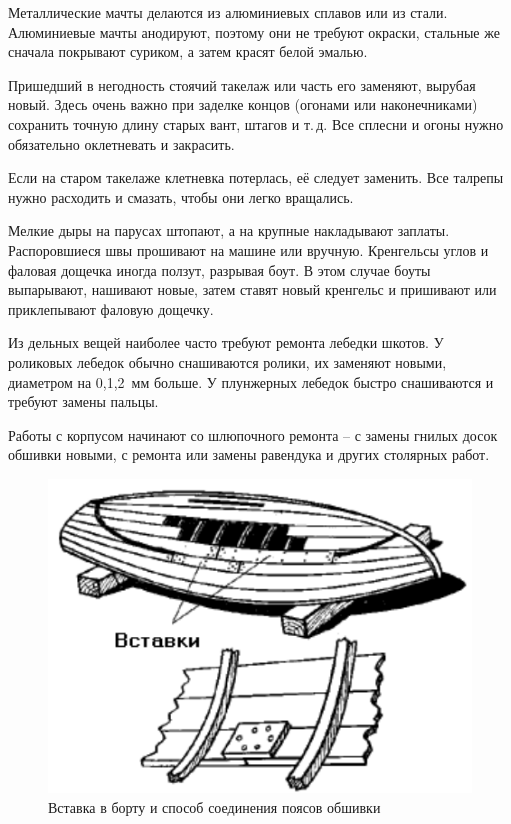 \documentclass[a4paper, 12pt, twoside, final]{scrbook}
\begin{document}
Металлические мачты делаются из алюминиевых сплавов или из стали. Алюминиевые мачты анодируют, поэтому они не требуют окраски, стальные же сначала покрывают суриком, а затем красят белой эмалью.

Пришедший в негодность стоячий такелаж или часть его заменяют, вырубая новый. Здесь очень важно при заделке концов (огонами или наконечниками) сохранить точную длину старых вант, штагов и т.\,д. Все сплесни и огоны нужно обязательно оклетневать и закрасить. 

Если на старом такелаже клетневка потерлась, её следует заменить. Все талрепы нужно расходить и смазать, чтобы они легко вращались.

Мелкие дыры на парусах штопают, а на крупные накладывают заплаты. Распоровшиеся швы прошивают на машине или вручную. Кренгельсы углов и фаловая дощечка иногда ползут, разрывая боут. В этом случае боуты выпарывают, нашивают новые, затем ставят новый кренгельс и пришивают или приклепывают фаловую дощечку.

Из дельных вещей наиболее часто требуют ремонта лебедки шкотов. У роликовых лебедок обычно снашиваются ролики, их заменяют новыми, диаметром на 0,1,2~мм больше. У плунжерных лебедок быстро снашиваются и требуют замены пальцы.

Работы с корпусом начинают со шлюпочного ремонта \--- с замены гнилых досок обшивки новыми, с ремонта или замены равендука и других столярных работ.

\begin{figure}
   \centering
   \includegraphics{pics/73_Vstavka} %
   \caption{Вставка в борту и способ соединения поясов обшивки}
   \label{fig:73}
\end{figure}
\end{document}
